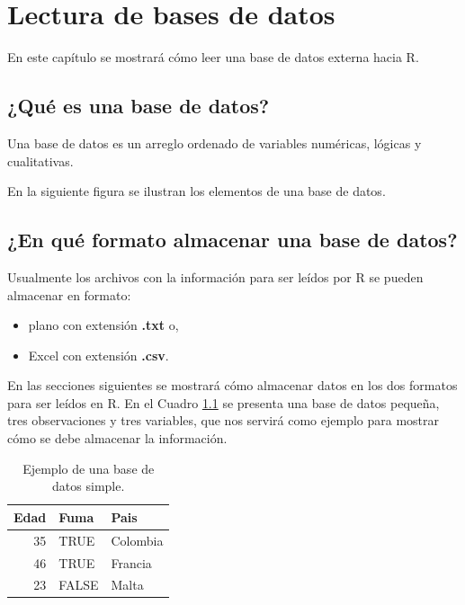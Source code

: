 \documentclass[
]{book}
\providecommand{\tightlist}{%
  \setlength{\itemsep}{0pt}\setlength{\parskip}{0pt}}
\begin{document}
\hypertarget{read}{%
\chapter{Lectura de bases de datos}\label{read}}

En este capítulo se mostrará cómo leer una base de datos externa hacia R.

\hypertarget{quuxe9-es-una-base-de-datos}{%
\section{¿Qué es una base de datos?}\label{quuxe9-es-una-base-de-datos}}

Una base de datos es un arreglo ordenado de variables numéricas, lógicas y cualitativas.

En la siguiente figura se ilustran los elementos de una base de datos.

\hypertarget{en-quuxe9-formato-almacenar-una-base-de-datos}{%
\section{¿En qué formato almacenar una base de datos?}\label{en-quuxe9-formato-almacenar-una-base-de-datos}}

Usualmente los archivos con la información para ser leídos por R se pueden almacenar en formato:

\begin{itemize}
\tightlist
\item
  plano con extensión \textbf{.txt} o,
\item
  Excel con extensión \textbf{.csv}.
\end{itemize}

En las secciones siguientes se mostrará cómo almacenar datos en los dos formatos para ser leídos en R. En el Cuadro \ref{tab:dt1} se presenta una base de datos pequeña, tres observaciones y tres variables, que nos servirá como ejemplo para mostrar cómo se debe almacenar la información.

\begin{table}

\caption{\label{tab:dt1}Ejemplo de una base de datos simple.}
\centering
\begin{tabular}[t]{rll}
\toprule
Edad & Fuma & Pais\\
\midrule
35 & TRUE & Colombia\\
46 & TRUE & Francia\\
23 & FALSE & Malta\\
\bottomrule
\end{tabular}
\end{table}
\end{document}
